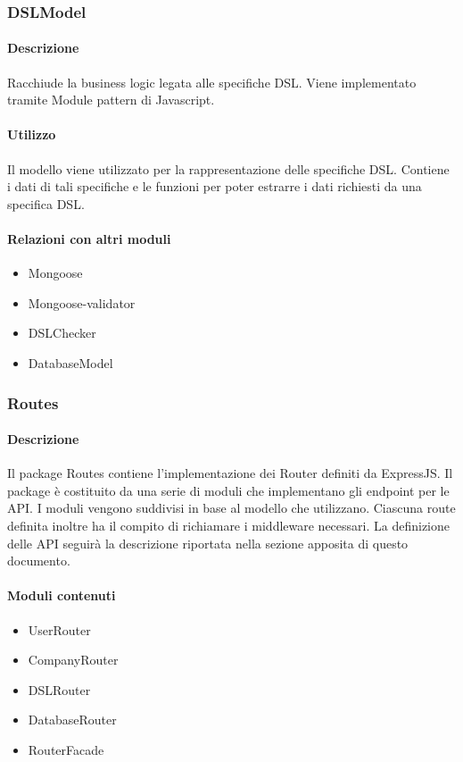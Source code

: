 \subsubsection{DSLModel}
\paragraph*{Descrizione}

Racchiude la business logic legata alle specifiche DSL. Viene implementato tramite Module pattern di Javascript. 

\paragraph*{Utilizzo}
Il modello viene utilizzato per la rappresentazione delle specifiche DSL. Contiene i dati di tali specifiche e le funzioni per poter estrarre i dati richiesti da una specifica DSL.

\paragraph*{Relazioni con altri moduli}
\begin{itemize}
\item Mongoose
\item Mongoose-validator
\item DSLChecker
\item DatabaseModel
\end{itemize}

\subsubsection{Routes}
\paragraph*{Descrizione}
Il package Routes contiene l'implementazione dei Router definiti da ExpressJS. Il package è costituito da una serie di moduli che implementano gli endpoint per le API.
I moduli vengono suddivisi in base al modello che utilizzano. Ciascuna route definita inoltre ha il compito di richiamare i middleware necessari.
La definizione delle API seguirà la descrizione riportata nella sezione apposita di questo documento.

\paragraph*{Moduli contenuti}
\begin{itemize}
\item UserRouter
\item CompanyRouter
\item DSLRouter
\item DatabaseRouter
\item RouterFacade
\end{itemize}

